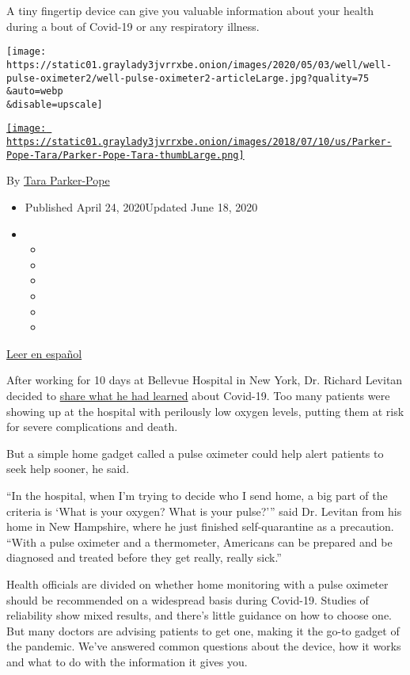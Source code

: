 A tiny fingertip device can give you valuable information about your
health during a bout of Covid-19 or any respiratory illness.

\texttt{[image: https://static01.graylady3jvrrxbe.onion/images/2020/05/03/well/well-pulse-oximeter2/well-pulse-oximeter2-articleLarge.jpg?quality=75\\\&auto=webp\\\&disable=upscale]}

\href{https://www.nytimes3xbfgragh.onion/by/tara-parker-pope}{\texttt{[image: https://static01.graylady3jvrrxbe.onion/images/2018/07/10/us/Parker-Pope-Tara/Parker-Pope-Tara-thumbLarge.png]}}

By \href{https://www.nytimes3xbfgragh.onion/by/tara-parker-pope}{Tara
Parker-Pope}

\begin{itemize}
\item
  Published April 24, 2020Updated June 18, 2020
\item
  \begin{itemize}
  \item
  \item
  \item
  \item
  \item
  \item
  \end{itemize}
\end{itemize}

\href{https://www.nytimes3xbfgragh.onion/es/2020/04/29/espanol/estilos-de-vida/oximetro-para-que-sirve.html}{Leer
en español}

After working for 10 days at Bellevue Hospital in New York, Dr. Richard
Levitan decided to
\href{https://www.nytimes3xbfgragh.onion/2020/04/20/opinion/coronavirus-testing-pneumonia.html}{share
what he had learned} about Covid-19. Too many patients were showing up
at the hospital with perilously low oxygen levels, putting them at risk
for severe complications and death.

But a simple home gadget called a pulse oximeter could help alert
patients to seek help sooner, he said.

``In the hospital, when I'm trying to decide who I send home, a big part
of the criteria is `What is your oxygen? What is your pulse?''' said Dr.
Levitan from his home in New Hampshire, where he just finished
self-quarantine as a precaution. ``With a pulse oximeter and a
thermometer, Americans can be prepared and be diagnosed and treated
before they get really, really sick.''

Health officials are divided on whether home monitoring with a pulse
oximeter should be recommended on a widespread basis during Covid-19.
Studies of reliability show mixed results, and there's little guidance
on how to choose one. But many doctors are advising patients to get one,
making it the go-to gadget of the pandemic. We've answered common
questions about the device, how it works and what to do with the
information it gives you.

